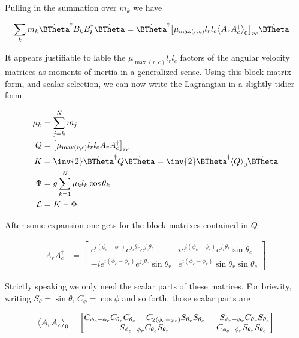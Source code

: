 Pulling in the summation over $m_k$ we have

\begin{align}\label{eqn:multiPendulumSpherical2:boo15}
\sum_k m_k
\dot{\BTheta}^\dagger
B_k B_k^\dagger
\dot{\BTheta}
&=
\dot{\BTheta}^\dagger
{\begin{bmatrix}
\mu_{\max(r,c)} l_r l_c \gpgradezero{A_r A_c^\dagger}
\end{bmatrix}}_{rc}
\dot{\BTheta}
\end{align}

It appears justifiable to lable the $\mu_{\max(r,c)} l_r l_c$ factors of the angular velocity matrices as moments of inertia in a generalized sense.  Using this block matrix form, and scalar selection, we can now write the Lagrangian in a slightly tidier form

\begin{align}\label{eqn:multiPendulumSpherical2:boo5}
\mu_k &= \sum_{j=k}^N m_j \\
Q &= 
{\begin{bmatrix}
\mu_{\max(r,c)} l_r l_c A_r A_c^\dagger
\end{bmatrix}}_{rc} \\
K &=
\inv{2} \dot{\BTheta}^\dagger Q
\dot{\BTheta} 
=\inv{2} \dot{\BTheta}^\dagger \gpgradezero{Q}
\dot{\BTheta} \\
\Phi &=
g \sum_{k=1}^N \mu_k l_k \cos\theta_k \\
\LL &= K - \Phi
\end{align}

After some expansion one gets for the block matrixes contained in $Q$

\begin{align}\label{eqn:multiPendulumSpherical2:boo12}
A_r A_c^\dagger
&=
\begin{bmatrix}
e^{i(\phi_c - \phi_r)} e^{j_r \theta_r} e^{j_c \theta_c} & i e^{i(\phi_c - \phi_r)} e^{j_r \theta_r} \sin\theta_c \\
-i e^{i(\phi_c - \phi_r)} e^{j_c \theta_c} \sin\theta_r  & e^{i(\phi_c - \phi_r)} \sin\theta_r \sin\theta_c
\end{bmatrix}
\end{align}

Strictly speaking we only need the scalar parts of these matrices.  For brievity, writing $S_\theta = \sin\theta$, $C_\phi = \cos\phi$ and so forth, those scalar parts are

\begin{align}\label{eqn:multiPendulumSpherical2:boo20}
{\left\langle{{A_r A_c^\dagger}}\right\rangle}_{0}
=
\begin{bmatrix}
C_{\phi_c - \phi_r} 
C_{\theta_r}
C_{\theta_c}
-C_{2(\phi_c - \phi_r)} 
S_{\theta_r}
S_{\theta_c} &
-S_{\phi_c - \phi_r} C_{\theta_r} S_{\theta_c} \\
S_{\phi_c - \phi_r} C_{\theta_c} S_{\theta_r} &
C_{\phi_c - \phi_r} S_{\theta_r} S_{\theta_c}
\end{bmatrix}
\end{align}

